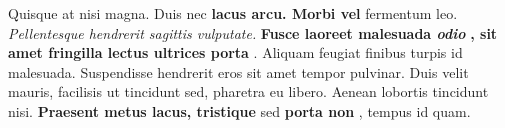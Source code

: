\documentclass[11pt, letterpaper, openany]{scrbook}
\begin{document}
\begin{sloppypar}

\begin{paracol}{1}
\fontsize{11}{13} Quisque at nisi magna. Duis nec \textbf{lacus arcu. Morbi vel} fermentum leo. \textit{Pellentesque hendrerit sagittis vulputate.} \textbf{Fusce laoreet malesuada \textit{odio}} \textbf{, sit amet fringilla lectus ultrices porta} . Aliquam feugiat finibus turpis id malesuada. Suspendisse hendrerit eros sit amet tempor pulvinar. Duis velit mauris, facilisis ut tincidunt sed, pharetra eu libero. Aenean lobortis tincidunt nisi. \textbf{Praesent metus lacus, tristique} sed \textbf{porta non} , tempus id quam.\switchcolumn 

\end{paracol}
\end{sloppypar}
\end{document}
